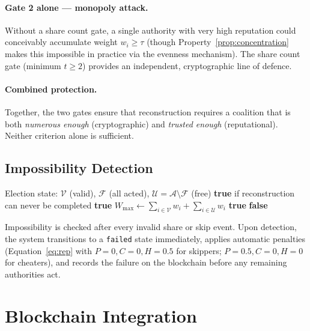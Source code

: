 \documentclass[12pt,a4paper]{article}
\theoremstyle{definition}
\theoremstyle{remark}
\begin{document}
\paragraph{Gate 2 alone — monopoly attack.}
Without a share count gate, a single authority with very high reputation
could conceivably accumulate weight $w_i \geq \tau$ (though
Property~\ref{prop:concentration} makes this impossible in practice via
the evenness mechanism). The share count gate (minimum $t \geq 2$) provides
an independent, cryptographic line of defence.

\paragraph{Combined protection.}
Together, the two gates ensure that reconstruction requires a coalition
that is both \emph{numerous enough} (cryptographic) and
\emph{trusted enough} (reputational). Neither criterion alone is sufficient.

\subsection{Impossibility Detection}

\begin{algorithm}[H]
\caption{Real-time impossibility check}
\label{alg:impossible}
\begin{algorithmic}[1]
\Require Election state: $\mathcal{V}$ (valid), $\mathcal{F}$ (all acted),
         $\mathcal{U} = \mathcal{A} \setminus \mathcal{F}$ (free)
\Ensure \textbf{true} if reconstruction can never be completed
  \Return \textbf{true} 
\EndIf
\State $W_{\max} \gets \sum_{i \in \mathcal{V}} w_i + \sum_{i \in \mathcal{U}} w_i$
  \Return \textbf{true} 
\EndIf
\Return \textbf{false}
\end{algorithmic}
\end{algorithm}

Impossibility is checked after every invalid share or skip event.
Upon detection, the system transitions to a \texttt{failed} state
immediately, applies automatic penalties (Equation~\eqref{eq:rep} with
$P=0, C=0, H=0.5$ for skippers; $P=0.5, C=0, H=0$ for cheaters), and
records the failure on the blockchain before any remaining authorities act.

\section{Blockchain Integration}
\label{sec:blockchain}
\end{document}
